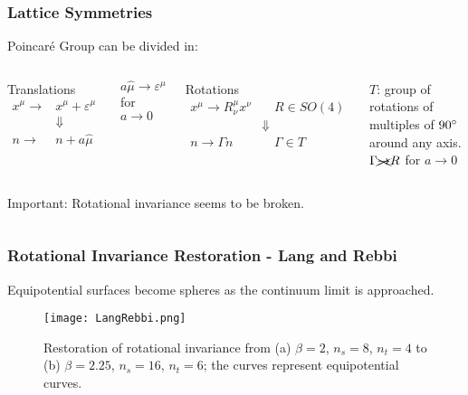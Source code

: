 \documentclass{beamer}
\begin{document}
\begin{frame}
  \frametitle{Lattice Symmetries}
  \centering
{}
  Poincaré Group can be divided in:
  \begin{columns}[t]
    \centering
    \begin{exampleblock}{\centering Translations}
      \vspace{-\baselineskip}
      \begin{align*}
        x^\mu \rightarrow& x^\mu+\varepsilon^\mu \\
        &\Downarrow \\
        n \rightarrow& n+a\hat\mu
      \end{align*}
    \end{exampleblock}
    \vspace{2.5\baselineskip}
    $a\hat\mu \rightarrow \varepsilon^\mu$ for $a\rightarrow0$
  
    \centering
{}
    \begin{exampleblock}{\centering Rotations}
      \vspace{-\baselineskip}
      \begin{align*}
        x^\mu \rightarrow R^\mu_\nu x^\nu &\quad R\in SO(4) \\
        &\Downarrow \\
        n \rightarrow \Gamma n &\quad \Gamma\in T
      \end{align*}
    \end{exampleblock}
    $T$: group of rotations of multiples of $90^\circ$ around any axis.\\
    \vspace{0.6\baselineskip}
    $\Gamma \xcancel{\rightarrow}R$ for $a\rightarrow0$
  \end{columns}
  \vspace{\baselineskip}
  \begin{columns}
    \begin{alertblock}{Important:}
      Rotational invariance seems to be broken.
    \end{alertblock}
  \end{columns}
\end{frame}

\begin{frame}
  \frametitle{Rotational Invariance Restoration - Lang and Rebbi}
  Equipotential surfaces become spheres as the continuum limit is approached.
  \begin{figure}
    \texttt{[image: LangRebbi.png]}
    \caption{Restoration of rotational invariance from (a) $\beta=2$, $n_s=8$, $n_t=4$ to (b) $\beta=2.25$, $n_s=16$, $n_t=6$; the curves represent equipotential curves. \cite{Lang:1982tj}}
  \end{figure}
\end{frame}
\end{document}
